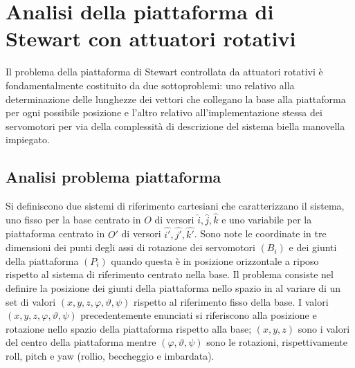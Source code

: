 \documentclass[11pt]{article}
\begin{document}
\section{Analisi della piattaforma di Stewart con attuatori rotativi}\label{analisi}

Il problema della piattaforma di Stewart controllata da attuatori rotativi è fondamentalmente costituito da due sottoproblemi: uno relativo alla determinazione delle lunghezze dei vettori che collegano la base alla piattaforma per ogni possibile posizione e l'altro relativo all'implementazione stessa dei servomotori per via della complessità di descrizione del sistema biella manovella impiegato. 

\subsection{Analisi problema piattaforma}

Si definiscono due sistemi di riferimento cartesiani che caratterizzano il sistema, uno fisso per la base centrato in $O$ di versori $\hat{i},\hat{j},\hat{k}$ e uno variabile per la piattaforma centrato in $O'$ di versori $\hat{i'},\hat{j'},\hat{k'}$. Sono note le coordinate in tre dimensioni dei punti degli assi di rotazione dei servomotori $({B_i})$ e dei giunti della piattaforma $(P_i)$ quando questa è in posizione orizzontale a riposo rispetto al sistema di riferimento centrato nella base. Il problema consiste nel definire la posizione dei giunti della piattaforma nello spazio in al variare di un set di valori $(x,y,z,\varphi,\vartheta,\psi)$ rispetto al riferimento fisso della base. I valori $(x,y,z,\varphi,\vartheta,\psi)$ precedentemente enunciati si riferiscono alla posizione e rotazione nello spazio della piattaforma rispetto alla base; $(x,y,z)$ sono i valori del centro della piattaforma mentre $(\varphi,\vartheta,\psi)$ sono le rotazioni, rispettivamente roll, pitch e yaw (rollio, beccheggio e imbardata).
\end{document}
